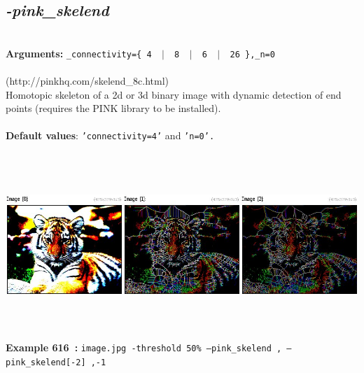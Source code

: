 \documentclass[a4paper,11pt,twoside]{book}
\begin{document}
\subsection{\emph{-pink\_skelend} }\vspace*{-0.5em}
~\\\textbf{Arguments: } 
{\small \texttt{\_connectivity=\{ 4 ~$|$~ 8 ~$|$~ 6 ~$|$~ 26 \},\_n=0}}\\~\\
(http://pinkhq.com/skelend\_8c.html)
~\\Homotopic skeleton of a 2d or 3d binary image with dynamic detection of end points (requires the PINK library to be installed).
~\\~\\\textbf{Default values}: {\small \texttt{'connectivity=4'} and \texttt{'n=0'.}}
\begin{center}\includegraphics[keepaspectratio=true,height=7cm,width=\textwidth]{img/gmic_def616.jpg}\\
{\footnotesize \textbf{Example 616~:} \texttt{image.jpg -threshold 50\% --pink\_skelend , --pink\_skelend[-2] ,-1}}
\end{center}
\end{document}
